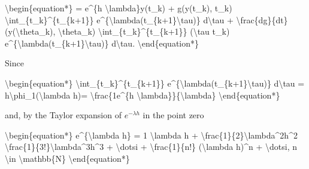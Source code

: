 \documentclass[letterpaper,10pt,english]{jupyterBook}
\begin{document}
\sphinxAtStartPar
\textbackslash{}begin\{equation*\}
= e\textasciicircum{}\{\sphinxhyphen{}h \textbackslash{}lambda\}y(t\_k) + g(y(t\_k), t\_k) \textbackslash{}int\_\{t\_k\}\textasciicircum{}\{t\_\{k+1\}\} e\textasciicircum{}\{\sphinxhyphen{}\textbackslash{}lambda(t\_\{k+1\}\sphinxhyphen{}\textbackslash{}tau)\} d\textbackslash{}tau + \textbackslash{}frac\{dg\}\{dt\} (y(\textbackslash{}theta\_k), \textbackslash{}theta\_k) \textbackslash{}int\_\{t\_k\}\textasciicircum{}\{t\_\{k+1\}\} (\textbackslash{}tau \sphinxhyphen{} t\_k) e\textasciicircum{}\{\sphinxhyphen{}\textbackslash{}lambda(t\_\{k+1\}\sphinxhyphen{}\textbackslash{}tau)\} d\textbackslash{}tau.
\textbackslash{}end\{equation*\}

\sphinxAtStartPar
Since

\sphinxAtStartPar
\textbackslash{}begin\{equation*\}
\textbackslash{}int\_\{t\_k\}\textasciicircum{}\{t\_\{k+1\}\} e\textasciicircum{}\{\sphinxhyphen{}\textbackslash{}lambda(t\_\{k+1\}\sphinxhyphen{}\textbackslash{}tau)\} d\textbackslash{}tau = h\textbackslash{}phi\_1(\sphinxhyphen{}\textbackslash{}lambda h)= \textbackslash{}frac\{1\sphinxhyphen{}e\textasciicircum{}\{\sphinxhyphen{}h \textbackslash{}lambda\}\}\{\textbackslash{}lambda\}
\textbackslash{}end\{equation*\}

\sphinxAtStartPar
and, by the Taylor expansion of \(e^{-\lambda h}\) in the point zero

\sphinxAtStartPar
\textbackslash{}begin\{equation*\}
e\textasciicircum{}\{\sphinxhyphen{}\textbackslash{}lambda h\} = 1 \sphinxhyphen{} \textbackslash{}lambda h + \textbackslash{}frac\{1\}\{2\}\textbackslash{}lambda\textasciicircum{}2h\textasciicircum{}2 \sphinxhyphen{} \textbackslash{}frac\{1\}\{3!\}\textbackslash{}lambda\textasciicircum{}3h\textasciicircum{}3 + \textbackslash{}dotsi + \textbackslash{}frac\{1\}\{n!\} (\sphinxhyphen{}\textbackslash{}lambda h)\textasciicircum{}n + \textbackslash{}dotsi, n \textbackslash{}in \textbackslash{}mathbb\{N\}
\textbackslash{}end\{equation*\}
\end{document}

